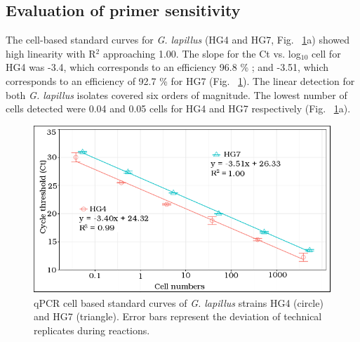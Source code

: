 \documentclass[12pt]{article}
\begin{document}
 
\subsection*{Evaluation of primer sensitivity}
\FloatBarrier
The cell-based standard curves for \emph{G. lapillus} (HG4 and HG7, Fig. ~\ref{fig:stdCurve}a) showed high linearity with R$^{2}$ approaching 1.00. 
The slope for the Ct vs. log$_{10}$ cell for HG4  was -3.4, which corresponds to an efficiency 96.8 \%%
; and -3.51, which corresponds to an efficiency of 92.7 \% %
for HG7 (Fig. ~\ref{fig:stdCurve}). 
The linear detection for both \emph{G. lapillus} isolates covered six orders of magnitude. 
The lowest number of cells detected were 0.04 and 0.05 cells for HG4 and HG7 respectively (Fig. ~\ref{fig:stdCurve}a).
\begin{figure}
\includegraphics[scale=.85]{Hero_qpcr-figs/Fig2_cell-based-stds-merged.png}
\caption{qPCR cell based standard curves of \emph{G. lapillus} strains HG4 (circle) and HG7 (triangle). Error bars represent the deviation of technical replicates during reactions.}%
\label{fig:stdCurve}
\end{figure}
\end{document}

